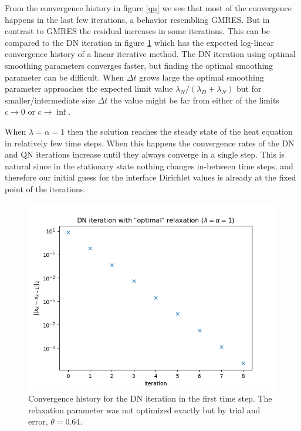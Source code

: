 \documentclass[]{article}
\begin{document}
From the convergence history in figure \ref{qn} we see that most of the convergence happens in the last few iterations, a behavior resembling GMRES. But in contrast to GMRES the residual increases in some iterations. This can be compared to the DN iteration in figure \ref{dn} which has the expected log-linear convergence history of a linear iterative method. The DN iteration using optimal smoothing parameters converges faster, but finding the optimal smoothing parameter can be difficult. When $\Delta t$ grows large the optimal smoothing parameter approaches the expected limit value $\lambda_N/(\lambda_{D} + \lambda_N)$ but for smaller/intermediate size $\Delta t$ the value might be far from either of the limits $c\to 0$ or $c\to \inf$.

When $\lambda=\alpha=1$ then the solution reaches the steady state of the heat equation in relatively few time steps. When this happens the convergence rates of the DN and QN iterations increase until they always converge in a single step. This is natural since in the stationary state nothing changes in-between time steps, and therefore our initial guess for the interface Dirichlet values is already at the fixed point of the iterations.


\begin{figure}
	\includegraphics[width=0.9\linewidth]{dn_1.png}
	\caption{\label{dn} Convergence history for the DN iteration in the first time step. The relaxation parameter was not optimized exactly but by trial and error, $\theta=0.64$.}
\end{figure}
\end{document}
